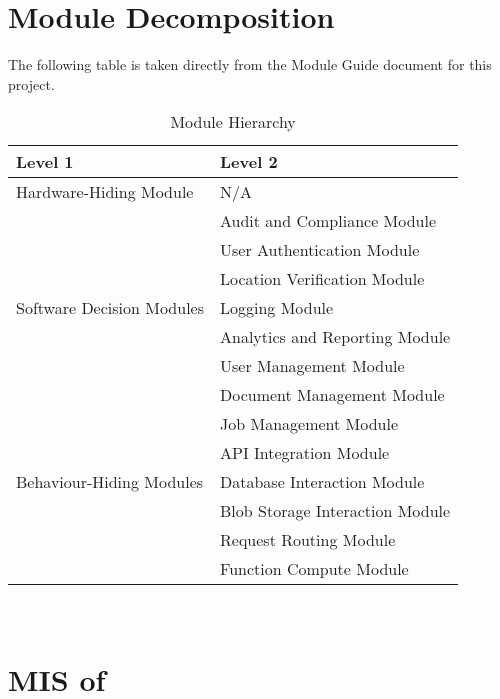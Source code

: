 \documentclass[12pt, titlepage]{article}
\begin{document}
\section{Module Decomposition}

The following table is taken directly from the Module Guide document
for this project.

\begin{table}[h!]
  \centering
  \begin{tabular}{p{} p{}}
    \toprule
    \textbf{Level 1}                                       &
    \textbf{Level 2}
    \\
    \midrule

    {Hardware-Hiding Module}                               & N/A
    \\
    \midrule

    \multirow{7}{0.3\textwidth}{Software Decision Modules} & Audit
    and Compliance Module
    \\
    & User Authentication Module      \\
    & Location Verification Module    \\
    & Logging Module                  \\
    & Analytics and Reporting Module  \\
    & User Management Module          \\
    & Document Management Module      \\
    & Job Management Module           \\
    \midrule

    \multirow{3}{0.3\textwidth}{Behaviour-Hiding Modules}  & {API
    Integration Module}
    \\
    & Database Interaction Module     \\
    & Blob Storage Interaction Module \\
    & Request Routing Module          \\
    & Function Compute Module         \\
    \bottomrule
  \end{tabular}
  \caption{Module Hierarchy}
  \label{TblMH}
\end{table}

\newpage
~\newpage

\section{MIS of } \label{Module} 
\end{document}

